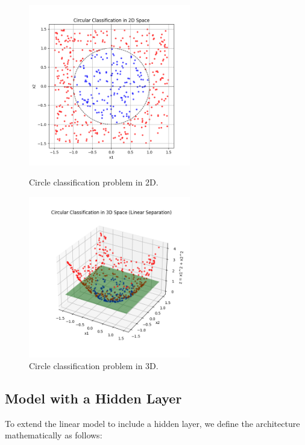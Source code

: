 \begin{figure}[H]
    \centering
    \begin{minipage}{.5\textwidth}
      \centering
      \includegraphics[width=200pt]{Regression/code/circular-data.png}
      \caption{Circle classification problem in 2D.}
      \label{fig:linear7}
    \end{minipage}%
    \begin{minipage}{.5\textwidth}
      \centering
      \includegraphics[width=200pt]{Regression/code/circular-data-3d.png}
      \caption{Circle classification problem in 3D.}
      \label{fig:linear8}
    \end{minipage}
\end{figure}

\subsection*{Model with a Hidden Layer}

To extend the linear model to include a hidden layer, we define the architecture mathematically as follows:

